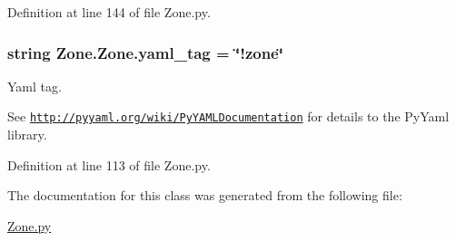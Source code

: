 Definition at line 144 of file Zone.py.

\hypertarget{class_zone_1_1_zone_aceea2ada107fbe1e78976e88a9bc74df}{
\subsubsection[{yaml\_\-tag}]{\setlength{\rightskip}{0pt plus 5cm}string {\bf Zone.Zone.yaml\_\-tag} = \char`\"{}!zone\char`\"{}}}
\label{class_zone_1_1_zone_aceea2ada107fbe1e78976e88a9bc74df}


Yaml tag. 

See \href{http://pyyaml.org/wiki/PyYAMLDocumentation}{\tt http://pyyaml.org/wiki/PyYAMLDocumentation} for details to the PyYaml library. 

Definition at line 113 of file Zone.py.



The documentation for this class was generated from the following file:\begin{DoxyCompactItemize}
\item 
\hyperlink{_zone_8py}{Zone.py}\end{DoxyCompactItemize}
